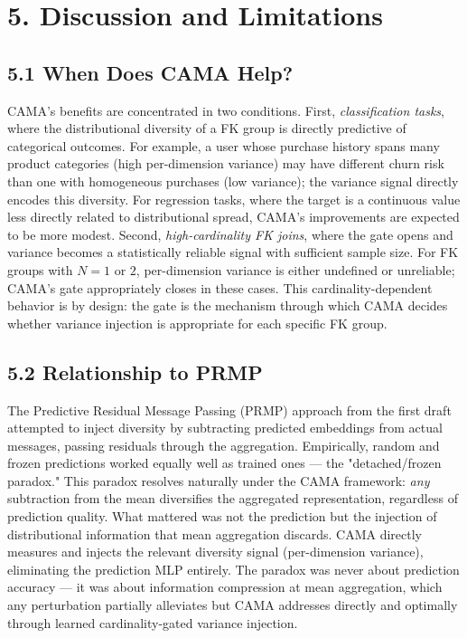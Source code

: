 \documentclass[final]{article}
\begin{document}
\section{5. Discussion and Limitations}

\subsection{5.1 When Does CAMA Help?}

CAMA's benefits are concentrated in two conditions. First, \textit{classification tasks}, where the distributional diversity of a FK group is directly predictive of categorical outcomes. For example, a user whose purchase history spans many product categories (high per-dimension variance) may have different churn risk than one with homogeneous purchases (low variance); the variance signal directly encodes this diversity. For regression tasks, where the target is a continuous value less directly related to distributional spread, CAMA's improvements are expected to be more modest. Second, \textit{high-cardinality FK joins}, where the gate opens and variance becomes a statistically reliable signal with sufficient sample size. For FK groups with $N = 1$ or $2$, per-dimension variance is either undefined or unreliable; CAMA's gate appropriately closes in these cases. This cardinality-dependent behavior is by design: the gate is the mechanism through which CAMA decides whether variance injection is appropriate for each specific FK group.

\subsection{5.2 Relationship to PRMP}

The Predictive Residual Message Passing (PRMP) approach from the first draft attempted to inject diversity by subtracting predicted embeddings from actual messages, passing residuals through the aggregation. Empirically, random and frozen predictions worked equally well as trained ones --- the "detached/frozen paradox." This paradox resolves naturally under the CAMA framework: \textit{any} subtraction from the mean diversifies the aggregated representation, regardless of prediction quality. What mattered was not the prediction but the injection of distributional information that mean aggregation discards. CAMA directly measures and injects the relevant diversity signal (per-dimension variance), eliminating the prediction MLP entirely. The paradox was never about prediction accuracy --- it was about information compression at mean aggregation, which any perturbation partially alleviates but CAMA addresses directly and optimally through learned cardinality-gated variance injection.
\end{document}
